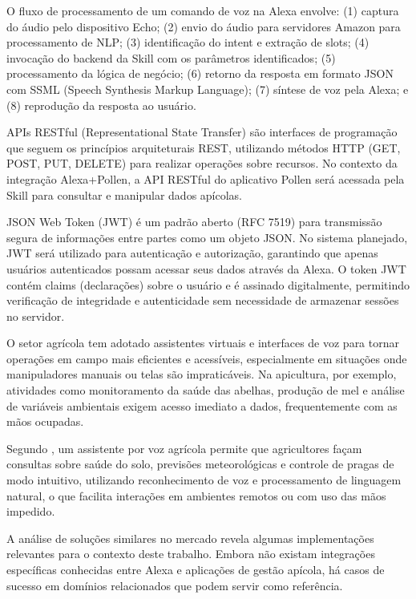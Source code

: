 O fluxo de processamento de um comando de voz na Alexa envolve: (1) captura do áudio pelo dispositivo Echo; (2) envio do áudio para servidores Amazon para processamento de NLP; (3) identificação do intent e extração de slots; (4) invocação do backend da Skill com os parâmetros identificados; (5) processamento da lógica de negócio; (6) retorno da resposta em formato JSON com SSML (Speech Synthesis Markup Language); (7) síntese de voz pela Alexa; e (8) reprodução da resposta ao usuário.


APIs RESTful (Representational State Transfer) são interfaces de programação que seguem os princípios arquiteturais REST, utilizando métodos HTTP (GET, POST, PUT, DELETE) para realizar operações sobre recursos. No contexto da integração Alexa+Pollen, a API RESTful do aplicativo Pollen será acessada pela Skill para consultar e manipular dados apícolas.

JSON Web Token (JWT) é um padrão aberto (RFC 7519) para transmissão segura de informações entre partes como um objeto JSON. No sistema planejado, JWT será utilizado para autenticação e autorização, garantindo que apenas usuários autenticados possam acessar seus dados através da Alexa. O token JWT contém claims (declarações) sobre o usuário e é assinado digitalmente, permitindo verificação de integridade e autenticidade sem necessidade de armazenar sessões no servidor.


O setor agrícola tem adotado assistentes virtuais e interfaces de voz para tornar operações em campo mais eficientes e acessíveis, especialmente em situações onde manipuladores manuais ou telas são impraticáveis. Na apicultura, por exemplo, atividades como monitoramento da saúde das abelhas, produção de mel e análise de variáveis ambientais exigem acesso imediato a dados, frequentemente com as mãos ocupadas.

Segundo \textcite{rajanala2025}, um assistente por voz agrícola permite que agricultores façam consultas sobre saúde do solo, previsões meteorológicas e controle de pragas de modo intuitivo, utilizando reconhecimento de voz e processamento de linguagem natural, o que facilita interações em ambientes remotos ou com uso das mãos impedido.

A análise de soluções similares no mercado revela algumas implementações relevantes para o contexto deste trabalho. Embora não existam integrações específicas conhecidas entre Alexa e aplicações de gestão apícola, há casos de sucesso em domínios relacionados que podem servir como referência.

